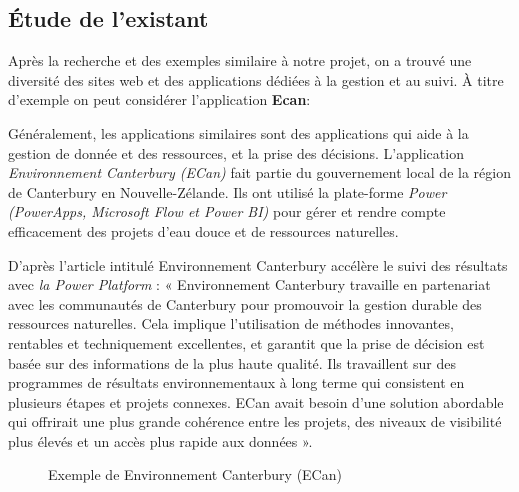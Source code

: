 \documentclass[a4paper]{report}
\begin{document}
\begin{doublespace}
	\subsection{Étude de l’existant}

	Après la recherche et des exemples similaire à notre projet, on a
	trouvé une diversité des sites web et des applications dédiées à la gestion et
	au suivi.
	À titre d'exemple on peut considérer l'application \textbf{\large Ecan}:

	Généralement, les applications similaires sont des applications qui
	aide à la gestion de donnée et des ressources, et la prise des décisions.
	L’application \emph{Environnement Canterbury (ECan)} fait partie du
	gouvernement local de la région de Canterbury en Nouvelle-Zélande. Ils ont
	utilisé la plate-forme \emph{Power
		(PowerApps, Microsoft Flow et Power BI)} pour gérer et rendre compte
	efficacement des projets d'eau douce et de ressources naturelles.

	D’après l'article intitulé Environnement Canterbury accélère le suivi
	des
	résultats avec \emph{la Power Platform} :
	« Environnement Canterbury travaille en partenariat avec les communautés
	de
	Canterbury pour promouvoir la gestion durable des ressources
	naturelles. Cela
	implique l'utilisation de méthodes innovantes, rentables et
	techniquement
	excellentes, et garantit que la prise de décision est basée sur des
	informations
	de la plus haute qualité. Ils travaillent sur des programmes de
	résultats
	environnementaux à long terme qui consistent en plusieurs étapes et
	projets
	connexes. ECan avait besoin d'une solution abordable qui offrirait une
	plus
	grande cohérence entre les projets, des niveaux de visibilité plus
	élevés et un
	accès plus rapide aux données ».
	\begin{figure}[H]
		\begin{center}
			\caption{Exemple de Environnement Canterbury (ECan)}
		\end{center}
	\end{figure}
	\newpage

\end{doublespace}
\end{document}
